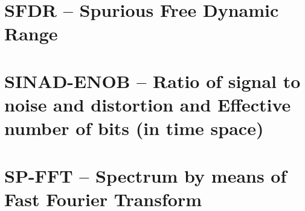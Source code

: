 \documentclass[12pt,a4paper,oneside]{report} %
\begin{document}
\section*{\infosection} %

\section*{\examplesection} %


\chapter{SFDR -- Spurious Free Dynamic Range} %
\section*{\infosection} %

\section*{\examplesection} %


\chapter{SINAD-ENOB -- Ratio of signal to noise and distortion and Effective number of bits (in time space)} %
\section*{\infosection} %

\section*{\examplesection} %


\chapter{SP-FFT -- Spectrum by means of Fast Fourier Transform} %
\end{document}
